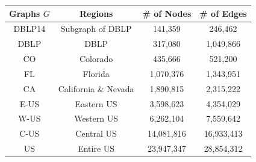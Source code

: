 \begin{table}[t!]
\begin{center}
\begin{scriptsize}
\begin{tabular}{|c||c|c|c|}
{\bf Graphs $G$} &  {\bf Regions} &  {\bf \# of Nodes} &   {\bf \# of Edges}\\
\hline\hline
DBLP14      &   Subgraph of DBLP          & 141,359  &   246,462  \\ \hline%
DBLP        & DBLP                        & 317,080 & 1,049,866    \\ \hline%
CO          &  Colorado              & 435,666      &  521,200      \\ \hline%
FL          &  Florida               & 1,070,376    &  1,343,951     \\ \hline%
CA          &  California \& Nevada   & 1,890,815   &  2,315,222      \\ \hline%
E-US        &  Eastern US            & 3,598,623    &  4,354,029     \\ \hline%
W-US        &  Western US            & 6,262,104    &  7,559,642      \\ \hline%
C-US        &  Central US            & 14,081,816   &  16,933,413    \\ \hline%
US          &  Entire US             & 23,947,347   &  28,854,312     \\ \hline%
\end{tabular}
\end{scriptsize}
\end{center}
\vspace{-4ex}
\end{table}




